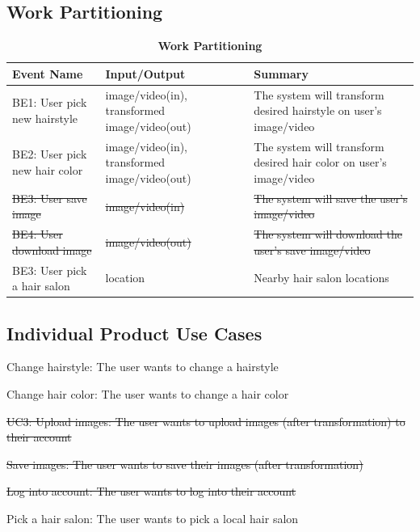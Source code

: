 \documentclass[12pt]{article}
\begin{document}
\subsection{Work Partitioning}
\begin{flushleft}
\begin{table}[bp hp]
\caption{\bf Work Partitioning}
    \begin{tabularx}{\linewidth}{|l|X|X|}
        \toprule {\bf Event Name} & {\bf Input/Output} & {\bf Summary}\\
        \midrule
        BE1: User pick new hairstyle & image/video(in), transformed image/video(out) & The system will transform desired hairstyle on user's image/video\\
        \hline
        BE2: User pick new hair color & image/video(in), transformed image/video(out) & The system will transform desired hair color on user's image/video\\
        \hline
        \sout{BE3: User save image} & \sout{image/video(in)} & \sout{The system will save the user's image/video}\\
        \hline
        \sout{BE4: User download image} & \sout{image/video(out)} & \sout{The system will download the user's save image/video}\\
        \hline
        BE3: User pick a hair salon & location & Nearby hair salon locations \\
        \bottomrule
    \end{tabularx}
\end{table}
\end{flushleft}

\subsection{Individual Product Use Cases}
\begin{UC}
    \item Change hairstyle: The user wants to change a hairstyle
    \item Change hair color: The user wants to change a hair color
    \item \sout{UC3: Upload images: The user wants to upload images (after transformation) to their account}
    \item \sout{Save images: The user wants to save their images (after transformation)}
    \item \sout{Log into account: The user wants to log into their account}
    \item Pick a hair salon: The user wants to pick a local hair salon
\end{UC}
\end{document}
